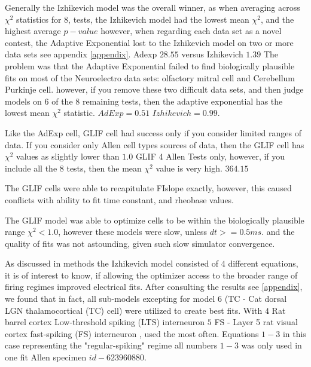 Generally the Izhikevich model was the overall winner, as when averaging across $\chi^{2}$ statistics for 8, tests, the Izhikevich model had the lowest mean $\chi^{2}$, and the highest average $p-value$ however, when regarding each data set as a novel contest, the Adaptive Exponential lost to the Izhikevich model on two or more data sets see appendix \ref{appendix}.
Adexp $28.55$ versus 
Izhikevich $1.39$
The problem was that the Adaptive Exponential failed to find biologically plausible fits on most of the Neuroelectro data sets: olfactory mitral cell and Cerebellum Purkinje cell. however, if you remove these two difficult data sets, and then judge models on 6 of the 8 remaining tests, then the adaptive exponential has the lowest mean $\chi^{2}$ statistic. $AdExp=0.51$	$Izhikevich=0.99$.

Like the AdExp cell, GLIF cell had success only if you consider limited ranges of data. If you consider only Allen cell types sources of data, then the GLIF cell has $\chi^{2}$ values as slightly lower than $1.0$ GLIF 4 Allen Tests only, however, if you include all the 8 tests, then the mean $\chi^{2}$ value is very high. $364.15$

The GLIF cells were able to recapitulate FIslope exactly, however, this caused conflicts with ability to fit time constant, and rheobase values.

The GLIF model was able to optimize cells to be within the biologically plausible range $\chi^{2}<1.0$, however these models were slow, unless $dt>=0.5ms$. and the quality of fits was not astounding, given such slow simulator convergence.

As discussed in methods the Izhikevich model consisted of $4$ different equations, it is of interest to know, if allowing the optimizer access to the broader range of firing regimes improved electrical fits. After consulting the results see \ref{appendix}, we found that in fact, all sub-models excepting for model $6$ (TC - Cat dorsal LGN thalamocortical (TC) cell) were utilized to create best fits. With $4$ Rat barrel cortex Low-threshold  spiking (LTS) interneuron 
$5$ FS - Layer 5 rat visual cortex fast-spiking (FS) interneuron , used the most often. Equations $1-3$ in this case representing the "regular-spiking" regime all numbers $1-3$ was only used in one fit Allen specimen $id-623960880$.




